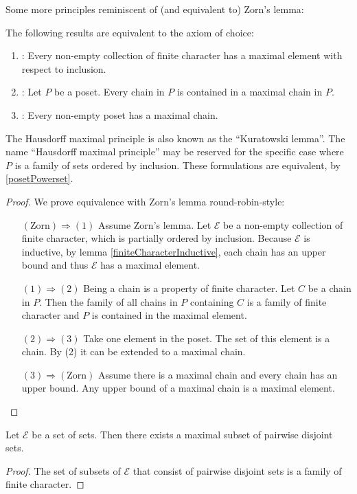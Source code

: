 Some more principles reminiscent of (and equivalent to) Zorn's lemma:
\begin{theorem} \label{ZornEquivalents}
The following results are equivalent to the axiom of choice:
\begin{enumerate}
\item {}: Every non-empty collection of finite character has a maximal element with respect to inclusion.
\item {}: Let $P$ be a poset. Every chain in $P$ is contained in a maximal chain in $P$.
\item {}: Every non-empty poset has a maximal chain.
\end{enumerate}
\end{theorem}
The Hausdorff maximal principle is also known as the ``Kuratowski lemma''. The name ``Hausdorff maximal principle'' may be reserved for the specific case where $P$ is a family of sets ordered by inclusion. These formulations are equivalent, by \ref{posetPowerset}.
\begin{proof}
We prove equivalence with Zorn's lemma round-robin-style:
\begin{itemize}[leftmargin=2cm]
\item[$\boxed{(\text{Zorn}) \Rightarrow (1)}$] Assume Zorn's lemma. Let $\mathcal{E}$ be a non-empty collection of finite character, which is partially ordered by inclusion. Because $\mathcal{E}$ is inductive, by lemma \ref{finiteCharacterInductive}, each chain has an upper bound and thus $\mathcal{E}$ has a maximal element.
\item[$\boxed{(1) \Rightarrow (2)}$] Being a chain is a property of finite character. Let $C$ be a chain in $P$. Then the family of all chains in $P$ containing $C$ is a family of finite character and $P$ is contained in the maximal element.
\item[$\boxed{(2) \Rightarrow (3)}$] Take one element in the poset. The set of this element is a chain. By (2) it can be extended to a maximal chain.
\item[$\boxed{(3) \Rightarrow (\text{Zorn})}$] Assume there is a maximal chain and every chain has an upper bound. Any upper bound of a maximal chain is a maximal element.
\end{itemize}
\end{proof}
\begin{corollary} \label{maximalSubsetOfDisjointSets}
Let $\mathcal{E}$ be a set of sets. Then there exists a maximal subset of pairwise disjoint sets. 
\end{corollary}
\begin{proof}
The set of subsets of $\mathcal{E}$ that consist of pairwise disjoint sets is a family of finite character.
\end{proof}

